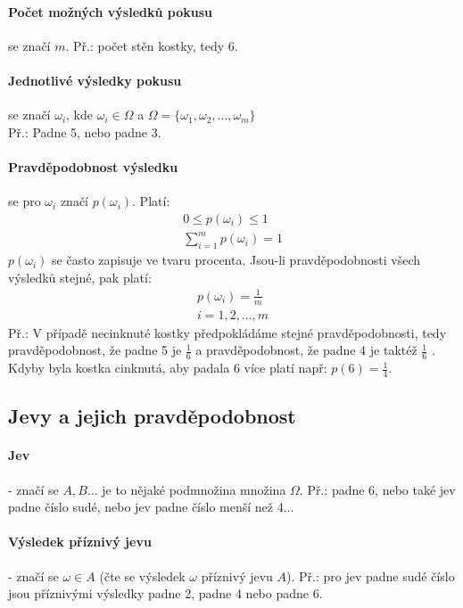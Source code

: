 \documentclass[12pt]{article}
\begin{document}
\paragraph{Počet možných výsledků pokusu} se značí $m$. Př.: počet stěn kostky, tedy 6.
\paragraph{Jednotlivé výsledky pokusu} se značí $\omega_i$, kde $\omega_i \in \Omega$ a $\Omega = \{ \omega_1, \omega_2, \dotsc, \omega_m \}$\\ Př.: Padne 5, nebo padne 3.
\paragraph{Pravděpodobnost výsledku} se pro $\omega_i$ značí $p(\omega_i)$. Platí:
\begin{align}
0 \leq p(\omega_i) \leq 1\\
\sum^m_{i=1}p(\omega_i) = 1
\end{align}
$p(\omega_i)$ se často zapisuje ve tvaru procenta. Jsou-li pravděpodobnosti všech výsledků stejné, pak platí:
\begin{align}
p\left(\omega_i\right) = \frac{1}{m}\\
i = 1,2, \dotsc, m
\end{align}
Př.: V případě necinknuté kostky předpokládáme stejné pravděpodobnosti, tedy pravděpodobnost, že padne 5 je $\frac{1}{6}$ a pravděpodobnost, že padne 4 je taktéž $\frac{1}{6}$ .\\ Kdyby byla kostka cinknutá, aby padala 6 více platí např: $p(6) = \frac{1}{4}$.

\subsection{Jevy a jejich pravděpodobnost}
\paragraph{Jev} - značí se $A,B \dotso$ je to nějaké podmnožina množina $\Omega$. Př.: padne 6, nebo také jev padne číslo sudé, nebo jev padne číslo menší než 4...
\paragraph{Výsledek příznivý jevu} - značí se $\omega \in A$ (čte se výsledek $\omega$ příznivý jevu $A$). Př.: pro jev padne sudé číslo jsou příznivými výsledky padne 2, padne 4 nebo padne 6.
\end{document}

